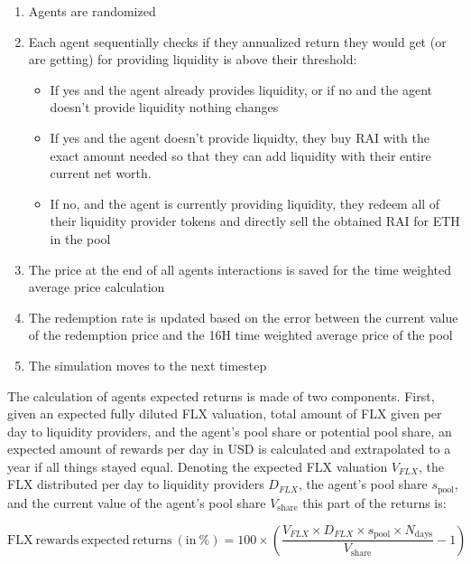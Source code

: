 \documentclass{article}
\begin{document}
    \begin{enumerate}
      \item Agents are randomized
      \item Each agent sequentially checks if they annualized return they would get (or are getting) for providing liquidity is above their threshold:
        \begin{itemize}
          \item If yes and the agent already provides liquidity, or if no and the agent doesn't provide liquidity nothing changes
          \item If yes and the agent doesn't provide liquidty, they buy RAI with the exact amount needed so that they can add liquidity with their entire current net worth. 
          \item If no, and the agent is currently providing liquidity, they redeem all of their liquidity provider tokens and directly sell the obtained RAI for ETH in the pool
        \end{itemize}
      \item The price at the end of all agents interactions is saved for the time weighted average price calculation
      \item The redemption rate is updated based on the error between the current value of the redemption price and the 16H time weighted average price of the pool
      \item The simulation moves to the next timestep
    \end{enumerate}

    The calculation of agents expected returns is made of two components. First, given an expected fully diluted FLX valuation, total amount of FLX given per day to liquidity providers, and the agent's pool share or potential pool share, an expected amount of rewards per day in USD is calculated and extrapolated to a year if all things stayed equal. Denoting the expected FLX valuation $V_{FLX}$, the FLX distributed per day to liquidity providers $D_{FLX}$, the agent's pool share $s_{\mathrm{pool}}$, and the current value of the agent's pool share $V_{\mathrm{share}}$ this part of the returns is: 
    
    \begin{equation*}
      \mathrm{FLX \ rewards \ expected \ returns \ (in \ \%)} =  100 \times \left( \frac{V_{FLX} \times D_{FLX} \times s_{\mathrm{pool}} \times N_{\mathrm{days}}}{V_{\mathrm{share}}} - 1 \right)
    \end{equation*}
    
\end{document}
